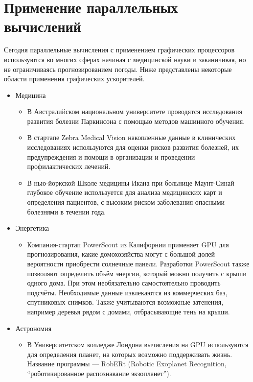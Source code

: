 \section{Применение параллельных вычислений}

Сегодня параллельные вычисления с применением графических процессоров используются во многих сферах начиная с медицинской науки и заканичивая, но не ограничиваясь прогнозированием погоды. Ниже представлены некоторые области применения графических ускорителей.

\begin{itemize}
\item{Медицина}
  \begin{itemize}
  \item{В Австралийском национальном университете проводятся исследования развития болезни Паркинсона с помощью методов машинного обучения\cite{almanac1}.}
  \item{В стартапе Zebra Medical Vision накопленные данные в клинических исследованиях используются для оценки рисков развития болезней, их предупреждения и помощи в организации и проведении профилактических лечений\cite{almanac1}.}
  \item{В нью-йоркской Школе медицины Икана при больнице Маунт-Синай глубокое обучение используется для анализа медицинских карт и определения пациентов, с высоким риском заболевания опасными болезнями в течении года\cite{almanac2}.}
 \end{itemize}

\item{Энергетика}

\begin{itemize}
  \item{Компания-стартап PowerScout из Калифорнии применяет GPU для прогнозирования, какие домохозяйства могут с большой долей вероятности приобрести солнечные панели. Разработки PowerScout также позволяют определить объём энергии, который можно получить с крыши одного дома. При этом необязательно самостоятельно проводить подсчёты. Необходимые данные извлекаются из коммерческих баз, спутниковых снимков. Также учитываются возможные затенения, например деревья рядом с домами, отбрасывающие тень на крыши\cite{almanac1}.}  
\end{itemize}

\item{Астрономия}

\begin{itemize}
  \item{В Университетском колледже Лондона вычисления на GPU используются для определения планет, на которых возможно поддерживать жизнь. Название программы --- RobERt (Robotic Exoplanet Recognition, ``роботизированное распознавание экзопланет'')\cite{almanac2}.}
\end{itemize}


\end{itemize}

